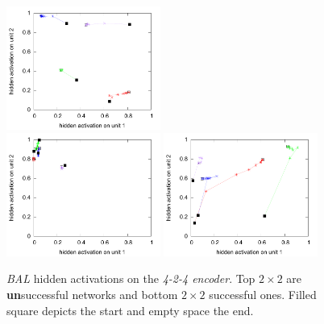 \begin{figure}[H]
  \includegraphics[width=0.45\textwidth]{img/hid-bal-good-convex.pdf}  \\
  \includegraphics[width=0.45\textwidth]{img/hid-bal-good-step.pdf}  
  \includegraphics[width=0.45\textwidth]{img/hid-bal-good-stagnation.pdf}  \\ 
  \caption{\emph{BAL} hidden activations on the \emph{4-2-4 encoder}. Top $2\times2$ are {\bf un}successful networks and bottom $2\times2$ successful ones. Filled square depicts the start and empty space the end.}
  \label{fig:results-hidden-activations-bal}
\end{figure}

